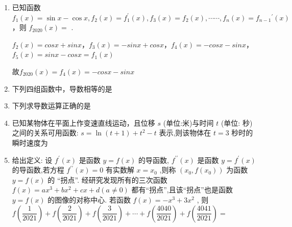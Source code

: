 \begin{enumerate}
    \item 已知函数 ${f}_{1}\left( x\right)  = \sin x - \cos x,{f}_{2}\left( x\right)  = {f}_{1}^{\prime }\left( x\right) ,{f}_{3}\left( x\right)  = {f}_{2}\left( x\right) ,\cdots \cdots ,{f_n}\left( x\right)  = f_{n-1}{}^{\prime }\left( x\right)$ ，则 ${f}_{2020}\left( x\right)  =$ .
    \begin{jieda}
        $f_2(x) = cosx+sinx$，$f_3(x) = -sinx+cosx$，$f_4(x) = -cosx-sinx$，$f_5(x) = sinx-cosx = f_1(x)$

        故$f_{2020}(x) = f_4(x) = -cosx-sinx$
    \end{jieda}

    \item 下列四组函数中，导数相等的是
    
    \item 下列求导数运算正确的是
    
    \item 已知某物体在平面上作变速直线运动，且位移 $s$ (单位:米)与时间 $t$ (单位: 秒) 之间的关系可用函数: $s = \ln \left( {t + 1}\right)  + {t}^{2} - t$ 表示,则该物体在 $t = 3$ 秒时的瞬时速度为
    
    \item 给出定义: 设 ${f}^{\prime }\left( x\right)$ 是函数 $y = f\left( x\right)$ 的导函数, ${f}^{\prime \prime }\left( x\right)$ 是函数 $y = {f}^{\prime }\left( x\right)$ 的导函数,若方程 ${f}^{\prime \prime }\left( x\right)  = 0$ 有实数解 $x = {x}_{0}$ ,则称 $\left( {{x}_{0},f\left( {x}_{0}\right) }\right)$ 为函数 $y = f\left( x\right)$ 的 “拐点”. 经研究发现所有的三次函数 $f\left( x\right)  = a{x}^{3} + b{x}^{2} + {cx} + d\left( {a \neq  0}\right)$ 都有“拐点”,且该“拐点”也是函数 $y = f\left( x\right)$ 的图像的对称中心. 若函数 $f\left( x\right)  =  - {x}^{3} + 3{x}^{2}$ , 则 $f\left( \dfrac{1}{2021}\right)  + f\left( \dfrac{2}{2021}\right)  + f\left( \dfrac{3}{2021}\right)  + \cdots  + f\left( \dfrac{4040}{2021}\right)  + f\left( \dfrac{4041}{2021}\right)  =$
    

\end{enumerate}
